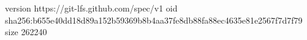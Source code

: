 version https://git-lfs.github.com/spec/v1
oid sha256:b655e40dd18d89a152b59369b8b4aa37fe8db88fa88ec4635e81e2567f7d7f79
size 262240
